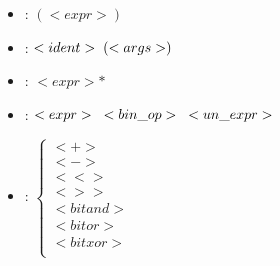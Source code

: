 \documentclass[12pt, a4paper]{article}
\begin{document}
\begin{itemize}
    \item{}
    :\hspace{\spacefromdefn}
    $(<expr>)$

    \item{}
    :\hspace{\spacefromdefn}
    $<ident> \hspace{1mm} (<args>)$

    \item{}
    :\hspace{\spacefromdefn}
    $<expr>*$

    \item{}
    :\hspace{\spacefromdefn}
    $<expr> \hspace{3mm} <bin\_op> \hspace{3mm} <un\_expr>$

\newpage
{}
    \item{}
    :\hspace{\spacefromdefn}
    \begin{math}
        \begin{cases}
            <+> \\
            <-> \\
            <<> \\
            <>> \\
            <bitand> \\
            <bitor> \\
            <bitxor> \\
        \end{cases}
    \end{math}
\end{itemize}
\end{document}
